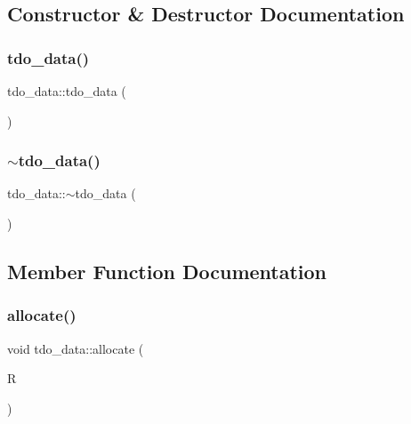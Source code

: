 \subsection{Constructor \& Destructor Documentation}
\mbox{\label{classtdo__data_a7198b60c6ab85328d7bc41fc2ab679b4}} 
\subsubsection{\texorpdfstring{tdo\+\_\+data()}{tdo\_data()}}
{\footnotesize\ttfamily tdo\+\_\+data\+::tdo\+\_\+data (\begin{DoxyParamCaption}{ }\end{DoxyParamCaption})}

\mbox{\label{classtdo__data_aa1befa7ab575f6456b51a2fa152a07de}} 
\subsubsection{\texorpdfstring{$\sim$tdo\+\_\+data()}{~tdo\_data()}}
{\footnotesize\ttfamily tdo\+\_\+data\+::$\sim$tdo\+\_\+data (\begin{DoxyParamCaption}{ }\end{DoxyParamCaption})}



\subsection{Member Function Documentation}
\mbox{\label{classtdo__data_a56fbeb13b7e63c64f087a02c6375e705}} 
\subsubsection{\texorpdfstring{allocate()}{allocate()}}
{\footnotesize\ttfamily void tdo\+\_\+data\+::allocate (\begin{DoxyParamCaption}\item[{\mbox{\hyperlink{galois_8h_a09fddde158a3a20bd2dcadb609de11dc}{I\+NT}}}]{R }\end{DoxyParamCaption})}

